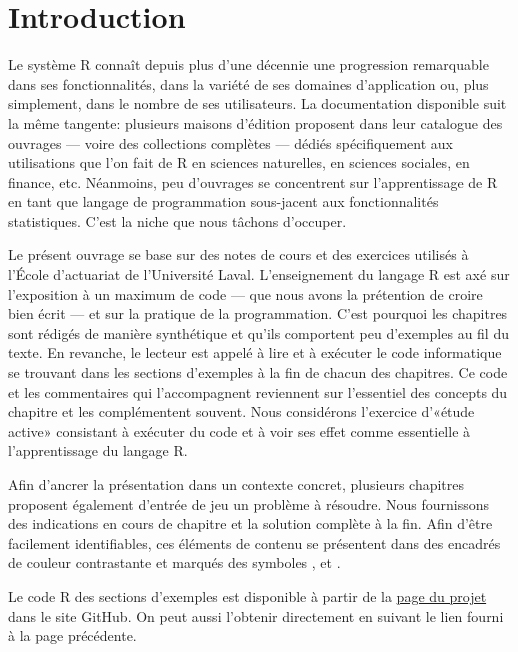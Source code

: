 \chapter*{Introduction}

Le système R connaît depuis plus d'une décennie une progression
remarquable dans ses fonctionnalités, dans la variété de ses domaines
d'application ou, plus simplement, dans le nombre de ses utilisateurs.
La documentation disponible suit la même tangente: plusieurs maisons
d'édition proposent dans leur catalogue des ouvrages --- voire des
collections complètes --- dédiés spécifiquement aux utilisations que
l'on fait de R en sciences naturelles, en sciences sociales, en
finance, etc. Néanmoins, peu d'ouvrages se concentrent sur
l'apprentissage de R en tant que langage de programmation sous-jacent
aux fonctionnalités statistiques. C'est la niche que nous tâchons
d'occuper.

Le présent ouvrage se base sur des notes de cours et des exercices
utilisés à l'École d'actuariat de l'Université Laval. L'enseignement
du langage R est axé sur l'exposition à un maximum de code --- que
nous avons la prétention de croire bien écrit --- et sur la pratique
de la programmation. C'est pourquoi les chapitres sont rédigés de
manière synthétique et qu'ils comportent peu d'exemples au fil du
texte. En revanche, le lecteur est appelé à lire et à exécuter le code
informatique se trouvant dans les sections d'exemples à la fin de
chacun des chapitres. Ce code et les commentaires qui l'accompagnent
reviennent sur l'essentiel des concepts du chapitre et les
complémentent souvent. Nous considérons l'exercice d'«étude active»
consistant à exécuter du code et à voir ses effet comme essentielle à
l'apprentissage du langage R.

Afin d'ancrer la présentation dans un contexte concret, plusieurs
chapitres proposent également d'entrée de jeu un problème à résoudre.
Nous fournissons des indications en cours de chapitre et la solution
complète à la fin. Afin d'être facilement identifiables, ces éléments
de contenu se présentent dans des encadrés de couleur contrastante et
marqués des symboles {\faCogs}, {\faBolt} et {\faLightbulbO}.

Le code R des sections d'exemples est disponible à partir de la
\href{https://vigou3.github.io/introduction-programmation-r/}{page du
  projet} dans le site GitHub. On peut aussi l'obtenir directement en
suivant le lien fourni à la page précédente.

